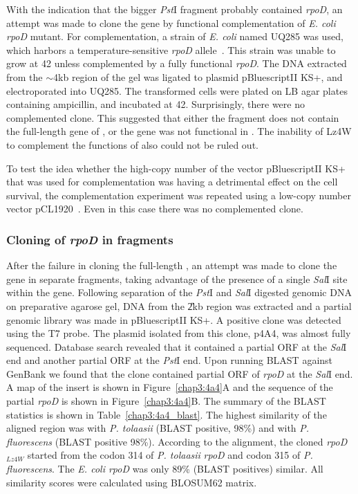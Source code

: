 With the indication that the bigger \emph{Pst}I fragment probably
contained \emph{rpoD}, an attempt was made to clone the gene by
functional complementation of \emph{E. coli rpoD} mutant. For
complementation,  a strain of \emph{E. coli} named UQ285 was used,
which harbors a temperature-sensitive \emph{rpoD}
allele~\citep{Isaksson1977}. This strain was unable to grow at
42\dg{} unless complemented by a fully functional \emph{rpoD}\@.
The DNA extracted from the \U{$\sim$4}{kb} region of the gel was
ligated to plasmid pBluescriptII KS+, and electroporated into
UQ285. The transformed cells were plated on LB agar plates
containing ampicillin, and incubated at 42\dg{}. Surprisingly,
there were no complemented clone. This suggested that either the
fragment does not contain the full-length gene of , or the
gene was not functional in . The inability of Lz4W
 to complement the functions of   also
could not be ruled out.

To test the idea whether the high-copy number of the vector
pBluescriptII KS+ that was used for complementation was having a
detrimental effect on the cell survival, the complementation
experiment was repeated using a low-copy number vector
pCL1920~\citep{Lerner1990}. Even in this case there was no
complemented clone.

\subsubsection{Cloning of \emph{rpoD} in fragments}

After the failure in cloning the full-length , an attempt
was made to clone the gene in separate fragments, taking advantage
of the presence of a single \emph{Sal}I site within the gene.
Following separation of the \emph{Pst}I and \emph{Sal}I digested
genomic DNA on preparative agarose gel, DNA from the \U{2}{kb}
region was extracted and a partial genomic library was made in
pBluescriptII KS+. A positive clone was detected using the T7
probe. The plasmid isolated from this clone, p4A4, was almost
fully sequenced. Database search revealed that it contained a
partial ORF at the \emph{Sal}I end and another partial ORF at the
\emph{Pst}I end. Upon running BLAST against GenBank we found that
the clone contained partial ORF of \emph{rpoD} at the \emph{Sal}I
end. A map of the insert is shown in Figure~\ref{chap3:4a4}A and
the sequence of the partial \emph{rpoD} is shown in
Figure~\ref{chap3:4a4}B. The summary of the BLAST statistics is
shown in Table~\ref{chap3:4a4_blast}. The highest similarity of
the aligned region was with \emph{P. tolaasii} (BLAST positive,
98\%) and with \emph{P. fluorescens} (BLAST positive 98\%).
According to the alignment, the cloned \emph{rpoD}$_{Lz4W}$
started from the codon 314 of \emph{P. tolaasii} \emph{rpoD} and
codon 315 of \emph{P. fluorescens}. The \emph{E. coli rpoD} was
only 89\% (BLAST positives) similar. All similarity scores were
calculated using BLOSUM62 matrix.

